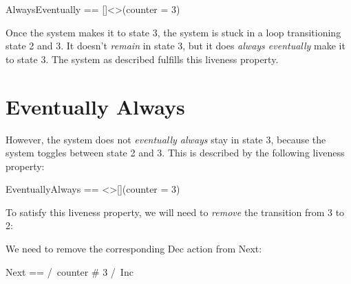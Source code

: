 \begin{tla}
    AlwaysEventually == []<>(counter = 3)
\end{tla}
\begin{tlatex}
\end{tlatex}
\newline

Once the system makes it to state 3, the system is stuck in a loop transitioning
state 2 and 3. It doesn't \textit{remain} in state 3, but it does \textit{always
eventually} make it to state 3. The system as described fulfills this liveness
property.

\section{Eventually Always}

However, the system does not \textit{eventually always} stay in state 3, because
the system toggles between state 2 and 3. This is described by the following
liveness property: \newline

\begin{tla}
    EventuallyAlways == <>[](counter = 3)
\end{tla}
\begin{tlatex}
\end{tlatex}
\newline

To satisfy this liveness property, we will need to \textit{remove} the transition from 3
to 2:

\begin{center}
\end{center}

We need to remove the corresponding Dec action from Next:\newline
\begin{tla}
Next ==
    \/ /\ counter # 3
       /\ Inc
\end{tla}
\begin{tlatex}
%
%
%
\end{tlatex}
\newline 

